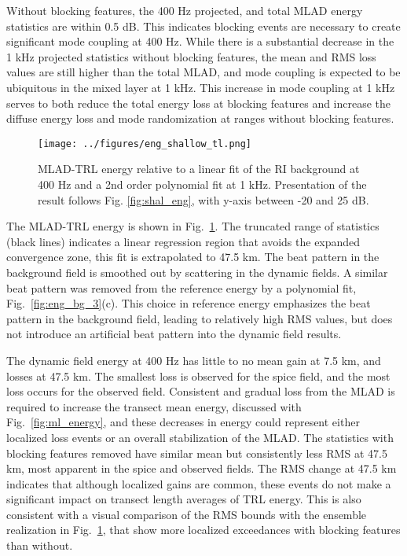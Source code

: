 \documentclass[preprint,NumberedRefs]{JASA}
\begin{document}
Without blocking features, the 400 Hz projected, and total MLAD energy statistics are within 0.5 dB. This indicates blocking events are necessary to create significant mode coupling at 400 Hz. While there is a substantial decrease in the 1 kHz projected statistics without blocking features, the mean and RMS loss values are still higher than the total MLAD, and mode coupling is expected to be ubiquitous in the mixed layer at 1 kHz. This increase in mode coupling at 1 kHz serves to both reduce the total energy loss at blocking features and increase the diffuse energy loss and mode randomization at ranges without blocking features.

\begin{figure}
\texttt{[image: ../figures/eng\_shallow\_tl.png]}
        \caption{MLAD-TRL energy relative to a linear fit of the RI background at 400 Hz and a 2nd order polynomial fit at 1 kHz. Presentation of the result follows Fig. \ref{fig:shal_eng}, with y-axis between -20 and 25 dB.}
    \label{fig:eng_tl}
\end{figure}
The MLAD-TRL energy is shown in Fig.~\ref{fig:eng_tl}. The truncated range of statistics (black lines) indicates a linear regression region that avoids the expanded convergence zone, this fit is extrapolated to 47.5 km. The beat pattern in the background field is smoothed out by scattering in the dynamic fields. A similar beat pattern was removed from the reference energy by a polynomial fit, Fig.~\ref{fig:eng_bg_3}(c). This choice in reference energy emphasizes the beat pattern in the background field, leading to relatively high RMS values, but does not introduce an artificial beat pattern into the dynamic field results.

The dynamic field energy at 400 Hz has little to no mean gain at 7.5 km, and losses at 47.5 km. The smallest loss is observed for the spice field, and the most loss occurs for the observed field. Consistent and gradual loss from the MLAD is required to increase the transect mean energy, discussed with Fig.~\ref{fig:ml_energy}, and these decreases in energy could represent either localized loss events or an overall stabilization of the MLAD. The statistics with blocking features removed have similar mean but consistently less RMS at 47.5 km, most apparent in the spice and observed fields. The RMS change at 47.5 km indicates that although localized gains are common, these events do not make a significant impact on transect length averages of TRL energy. This is also consistent with a visual comparison of the RMS bounds with the ensemble realization in Fig.~\ref{fig:eng_tl}, that show more localized exceedances with blocking features than without.
\end{document}
